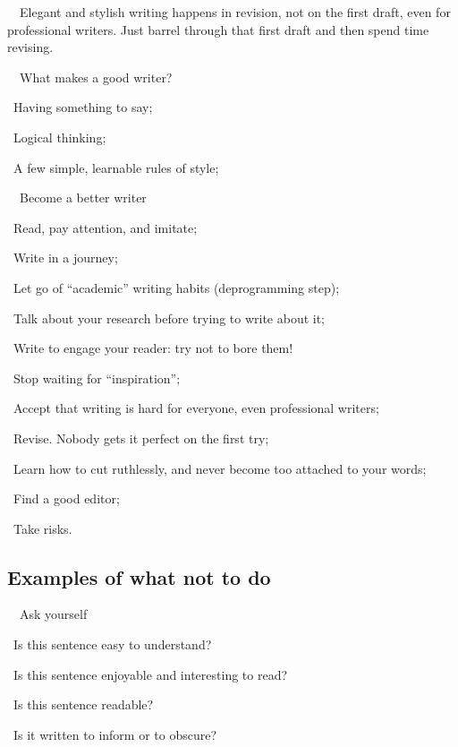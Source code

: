 \documentclass[a4paper, 12pt]{article}
\begin{document}
\par\ \textbullet\ Elegant and stylish writing happens in revision, not on the first draft, even for professional writers. Just barrel through that first draft and then spend time revising.

\par\ \textbullet\ What makes a good writer?
\par\quad\textopenbullet\ Having something to say;
\par\quad\textopenbullet\ Logical thinking;
\par\quad\textopenbullet\ A few simple, learnable rules of style;

\par\ \textbullet\ Become a better writer
\par\quad\textopenbullet\ Read, pay attention, and imitate;
\par\quad\textopenbullet\ Write in a journey;
\par\quad\textopenbullet\ Let go of ``academic'' writing habits (deprogramming step);
\par\quad\textopenbullet\ Talk about your research before trying to write about it;
\par\quad\textopenbullet\ Write to engage your reader: try not to bore them!
\par\quad\textopenbullet\ Stop waiting for ``inspiration'';
\par\quad\textopenbullet\ Accept that writing is hard for everyone, even professional writers;
\par\quad\textopenbullet\ Revise. Nobody gets it perfect on the first try;
\par\quad\textopenbullet\ Learn how to cut ruthlessly, and never become too attached to your words;
\par\quad\textopenbullet\ Find a good editor;
\par\quad\textopenbullet\ Take risks.

\subsection{Examples of what not to do}

\par\ \textbullet\ Ask yourself
\par\quad\textopenbullet\ Is this sentence easy to understand?
\par\quad\textopenbullet\ Is this sentence enjoyable and interesting to read?
\par\quad\textopenbullet\ Is this sentence readable?
\par\quad\textopenbullet\ Is it written to inform or to obscure?
\end{document}
